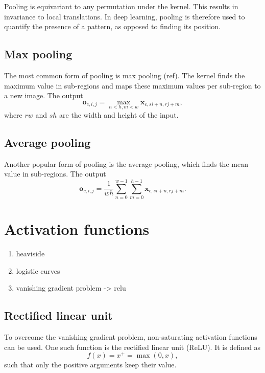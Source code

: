 Pooling is equivariant to any permutation under the kernel.
This results in invariance to local translations.
In deep learning, pooling is therefore used to quantify the presence of a pattern, as opposed to finding its position.

\subsection{Max pooling}\label{subsec:maxpool}
The most common form of pooling is max pooling (ref).
The kernel finds the maximum value in sub-regions and maps these maximum values per sub-region to a new image.
The output
\begin{equation}
    \mathbf{o}_{c, i, j} = \max_{n < h, m < w}\mathbf{x}_{c, si+n, rj+m},
\end{equation}
where $rw$ and $sh$ are the width and height of the input.

\subsection{Average pooling}\label{subsec:avgpool}
Another popular form of pooling is the average pooling, which finds the mean value in sub-regions.
The output
\begin{equation}
    \mathbf{o}_{c, i, j} = \frac{1}{wh}\sum_{n=0}^{w-1}\sum_{m=0}^{h-1}\mathbf{x}_{c,si+n,rj+m}.
\end{equation}

\section{Activation functions}\label{sec:activations}

\begin{enumerate}
    \item heaviside
    \item logistic curves
    \item vanishing gradient problem -> relu
\end{enumerate}

\subsection{Rectified linear unit}\label{subsec:relu}
To overcome the vanishing gradient problem, non-saturating activation functions can be used.
One such function is the rectified linear unit (ReLU).
It is defined as
\begin{equation}
    f(x) = x^+ = \max(0, x),
\end{equation}
such that only the positive arguments keep their value.


